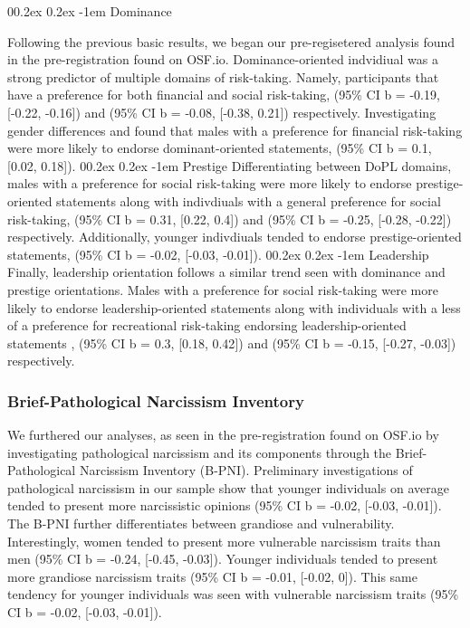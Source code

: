 \documentclass[
  donotrepeattitle,doc, 12pt, a4paper,floatsintext]{apa7}
\makeatletter
\let\oldparagraph\paragraph
\renewcommand{\paragraph}[1]{\oldparagraph{#1}\mbox{}}
\renewcommand{\paragraph}{\@startsection{paragraph}{4}{\parindent}%
  {0\baselineskip \@plus 0.2ex \@minus 0.2ex}%
  {-1em}%
  {\normalfont\normalsize\bfseries\itshape\typesectitle}}
\makeatother
\begin{document}
\hypertarget{dominance-1}{%
\paragraph{Dominance}\label{dominance-1}}
Following the previous basic results, we began our pre-regisetered analysis found in the pre-registration found on OSF.io. Dominance-oriented indvidiual was a strong predictor of multiple domains of risk-taking. Namely, participants that have a preference for both financial and social risk-taking, (95\% CI b = -0.19, {[}-0.22, -0.16{]}) and (95\% CI b = -0.08, {[}-0.38, 0.21{]}) respectively. Investigating gender differences and found that males with a preference for financial risk-taking were more likely to endorse dominant-oriented statements, (95\% CI b = 0.1, {[}0.02, 0.18{]}).
\hypertarget{prestige-1}{%
\paragraph{Prestige}\label{prestige-1}}
Differentiating between DoPL domains, males with a preference for social risk-taking were more likely to endorse prestige-oriented statements along with indivdiuals with a general preference for social risk-taking, (95\% CI b = 0.31, {[}0.22, 0.4{]}) and (95\% CI b = -0.25, {[}-0.28, -0.22{]}) respectively. Additionally, younger indivdiuals tended to endorse prestige-oriented statements, (95\% CI b = -0.02, {[}-0.03, -0.01{]}).
\hypertarget{leadership-1}{%
\paragraph{Leadership}\label{leadership-1}}
Finally, leadership orientation follows a similar trend seen with dominance and prestige orientations. Males with a preference for social risk-taking were more likely to endorse leadership-oriented statements along with individuals with a less of a preference for recreational risk-taking endorsing leadership-oriented statements , (95\% CI b = 0.3, {[}0.18, 0.42{]}) and (95\% CI b = -0.15, {[}-0.27, -0.03{]}) respectively.
\hypertarget{brief-pathological-narcissism-inventory-1}{%
\subsubsection{Brief-Pathological Narcissism Inventory}\label{brief-pathological-narcissism-inventory-1}}
We furthered our analyses, as seen in the pre-registration found on OSF.io by investigating pathological narcissism and its components through the Brief-Pathological Narcissism Inventory (B-PNI). Preliminary investigations of pathological narcissism in our sample show that younger individuals on average tended to present more narcissistic opinions (95\% CI b = -0.02, {[}-0.03, -0.01{]}). The B-PNI further differentiates between grandiose and vulnerability. Interestingly, women tended to present more vulnerable narcissism traits than men (95\% CI b = -0.24, {[}-0.45, -0.03{]}). Younger individuals tended to present more grandiose narcissism traits (95\% CI b = -0.01, {[}-0.02, 0{]}). This same tendency for younger individuals was seen with vulnerable narcissism traits (95\% CI b = -0.02, {[}-0.03, -0.01{]}).
\end{document}

